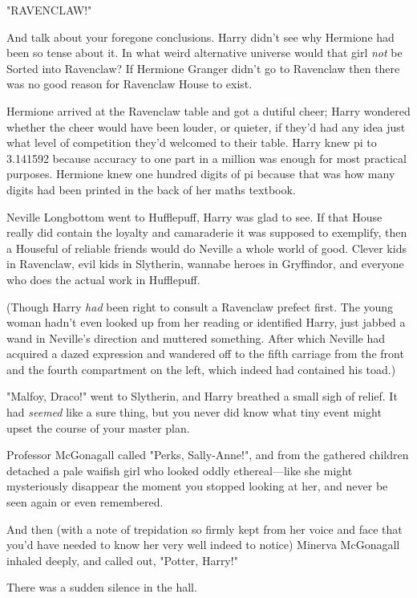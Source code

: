 "RAVENCLAW!"

And talk about your foregone conclusions. Harry didn't see why Hermione had 
been so tense about it. In what weird alternative universe would that girl 
\emph{not} be Sorted into Ravenclaw? If Hermione Granger didn't go to Ravenclaw 
then there was no good reason for Ravenclaw House to exist.

Hermione arrived at the Ravenclaw table and got a dutiful cheer; Harry wondered 
whether the cheer would have been louder, or quieter, if they'd had any idea 
just what level of competition they'd welcomed to their table. Harry knew pi to 
3.141592 because accuracy to one part in a million was enough for most 
practical purposes. Hermione knew one hundred digits of pi because that was how 
many digits had been printed in the back of her maths textbook.

Neville Longbottom went to Hufflepuff, Harry was glad to see. If that House 
really did contain the loyalty and camaraderie it was supposed to exemplify, 
then a Houseful of reliable friends would do Neville a whole world of good. 
Clever kids in Ravenclaw, evil kids in Slytherin, wannabe heroes in Gryffindor, 
and everyone who does the actual work in Hufflepuff.

(Though Harry \emph{had} been right to consult a Ravenclaw prefect first. The 
young woman hadn't even looked up from her reading or identified Harry, just 
jabbed a wand in Neville's direction and muttered something. After which 
Neville had acquired a dazed expression and wandered off to the fifth carriage 
from the front and the fourth compartment on the left, which indeed had 
contained his toad.)

"Malfoy, Draco!" went to Slytherin, and Harry breathed a small sigh of relief. 
It had \emph{seemed} like a sure thing, but you never did know what tiny event 
might upset the course of your master plan.

Professor McGonagall called "Perks, Sally-Anne!", and from the gathered 
children detached a pale waifish girl who looked oddly ethereal---like she 
might mysteriously disappear the moment you stopped looking at her, and never 
be seen again or even remembered.

And then (with a note of trepidation so firmly kept from her voice and face 
that you'd have needed to know her very well indeed to notice) Minerva 
McGonagall inhaled deeply, and called out, "Potter, Harry!"

There was a sudden silence in the hall.

